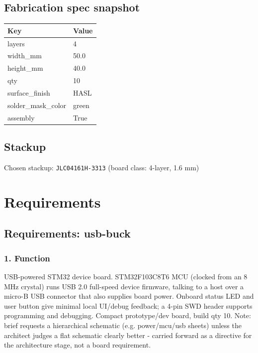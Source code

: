\documentclass[11pt,a4paper]{article}
\begin{document}
\subsection*{Fabrication spec snapshot}
{\small
\begin{longtable}{ll}
\toprule
\textbf{Key} & \textbf{Value} \\
\midrule
\endhead
layers & 4 \\
width\_mm & 50.0 \\
height\_mm & 40.0 \\
qty & 10 \\
surface\_finish & HASL \\
solder\_mask\_color & green \\
assembly & True \\
\bottomrule
\end{longtable}
}
\subsection*{Stackup}
Chosen stackup: \texttt{JLC04161H-3313} (board class: 4-layer, 1.6 mm)
\section{Requirements}
\subsection*{Requirements: usb-buck}
\subsubsection*{1. Function}
USB-powered STM32 device board. STM32F103C8T6 MCU (clocked from an 8 MHz crystal) runs USB 2.0 full-speed device firmware, talking to a host over a micro-B USB connector that also supplies board power. Onboard status LED and user button give minimal local UI/debug feedback; a 4-pin SWD header supports programming and debugging. Compact prototype/dev board, build qty 10. Note: brief requests a hierarchical schematic (e.g. power/mcu/usb sheets) unless the architect judges a flat schematic clearly better - carried forward as a directive for the architecture stage, not a board requirement.
\end{document}
